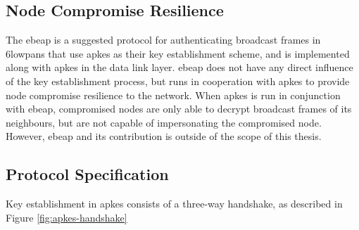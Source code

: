 \subsection{Node Compromise Resilience}

The \gls{ebeap} is a suggested protocol for authenticating broadcast frames in \gls{6lowpan}s that use \gls{apkes} as their key establishment scheme, and is implemented along with \gls{apkes} in the data link layer. \gls{ebeap} does not have any direct influence of the key establishment process, but runs in cooperation with \gls{apkes} to provide node compromise resilience to the network. When \gls{apkes} is run in conjunction with \gls{ebeap}, compromised nodes are only able to decrypt broadcast frames of its neighbours, but are not capable of impersonating the compromised node. However, \gls{ebeap} and its contribution is outside of the scope of this thesis.





\subsection{Protocol Specification}
\label{subsec:apkes-spec}

Key establishment in \gls{apkes} consists of a three-way handshake, as described in Figure \ref{fig:apkes-handshake}

